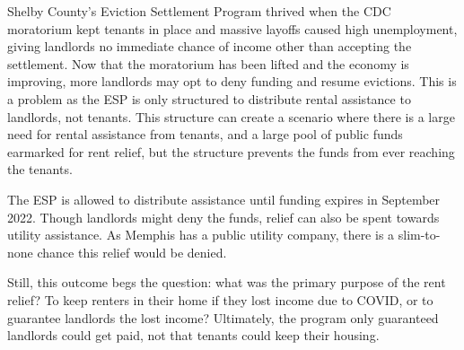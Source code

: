 \documentclass[
  openany]{book}
\begin{document}
Shelby County's Eviction Settlement Program thrived when the CDC moratorium kept tenants in place and massive layoffs caused high unemployment, giving landlords no immediate chance of income other than accepting the settlement. Now that the moratorium has been lifted and the economy is improving, more landlords may opt to deny funding and resume evictions. This is a problem as the ESP is only structured to distribute rental assistance to landlords, not tenants. This structure can create a scenario where there is a large need for rental assistance from tenants, and a large pool of public funds earmarked for rent relief, but the structure prevents the funds from ever reaching the tenants.

The ESP is allowed to distribute assistance until funding expires in September 2022. Though landlords might deny the funds, relief can also be spent towards utility assistance. As Memphis has a public utility company, there is a slim-to-none chance this relief would be denied.

Still, this outcome begs the question: what was the primary purpose of the rent relief? To keep renters in their home if they lost income due to COVID, or to guarantee landlords the lost income? Ultimately, the program only guaranteed landlords could get paid, not that tenants could keep their housing.
\end{document}
